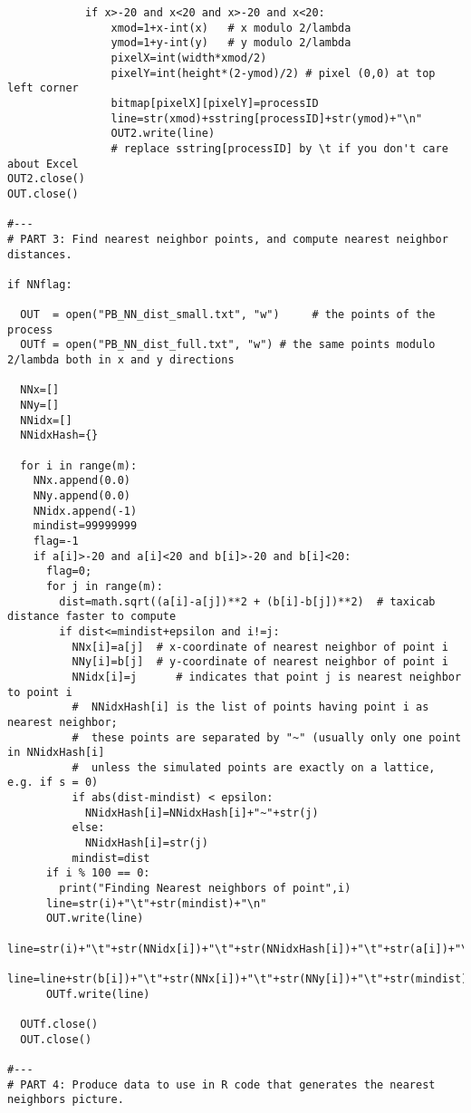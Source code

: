 \documentclass[oneside,10pt]{book}
\begin{document}
\begin{lstlisting}
            if x>-20 and x<20 and x>-20 and x<20:
                xmod=1+x-int(x)   # x modulo 2/lambda
                ymod=1+y-int(y)   # y modulo 2/lambda
                pixelX=int(width*xmod/2)
                pixelY=int(height*(2-ymod)/2) # pixel (0,0) at top left corner
                bitmap[pixelX][pixelY]=processID
                line=str(xmod)+sstring[processID]+str(ymod)+"\n"
                OUT2.write(line)
                # replace sstring[processID] by \t if you don't care about Excel
OUT2.close()
OUT.close()

#---
# PART 3: Find nearest neighbor points, and compute nearest neighbor distances.

if NNflag:

  OUT  = open("PB_NN_dist_small.txt", "w")     # the points of the process
  OUTf = open("PB_NN_dist_full.txt", "w") # the same points modulo 2/lambda both in x and y directions

  NNx=[]
  NNy=[]
  NNidx=[]
  NNidxHash={}

  for i in range(m):
    NNx.append(0.0)
    NNy.append(0.0)
    NNidx.append(-1)
    mindist=99999999
    flag=-1
    if a[i]>-20 and a[i]<20 and b[i]>-20 and b[i]<20:
      flag=0;
      for j in range(m):
        dist=math.sqrt((a[i]-a[j])**2 + (b[i]-b[j])**2)  # taxicab distance faster to compute
        if dist<=mindist+epsilon and i!=j:
          NNx[i]=a[j]  # x-coordinate of nearest neighbor of point i
          NNy[i]=b[j]  # y-coordinate of nearest neighbor of point i
          NNidx[i]=j      # indicates that point j is nearest neighbor to point i
          #  NNidxHash[i] is the list of points having point i as nearest neighbor;
          #  these points are separated by "~" (usually only one point in NNidxHash[i]
          #  unless the simulated points are exactly on a lattice, e.g. if s = 0)
          if abs(dist-mindist) < epsilon:
            NNidxHash[i]=NNidxHash[i]+"~"+str(j)
          else:
            NNidxHash[i]=str(j)
          mindist=dist
      if i % 100 == 0:
        print("Finding Nearest neighbors of point",i)
      line=str(i)+"\t"+str(mindist)+"\n"
      OUT.write(line)
      line=str(i)+"\t"+str(NNidx[i])+"\t"+str(NNidxHash[i])+"\t"+str(a[i])+"\t"
      line=line+str(b[i])+"\t"+str(NNx[i])+"\t"+str(NNy[i])+"\t"+str(mindist)+"\n"
      OUTf.write(line)

  OUTf.close()
  OUT.close()

#---
# PART 4: Produce data to use in R code that generates the nearest neighbors picture.


\end{lstlisting}
\end{document}
